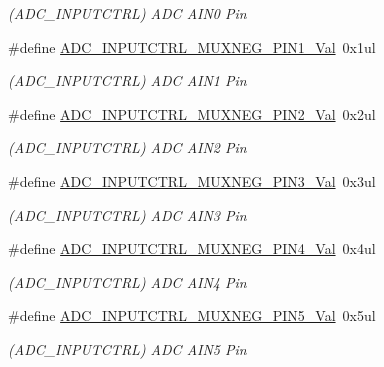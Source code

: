 \begin{DoxyCompactItemize}
\begin{DoxyCompactList}\small\item\em (A\+D\+C\+\_\+\+I\+N\+P\+U\+T\+C\+T\+RL) A\+DC A\+I\+N0 Pin \end{DoxyCompactList}\item 
\#define \mbox{\hyperlink{group___s_a_m_d21___a_d_c_gac312c379eda7c03b413687c7e26e6b94}{A\+D\+C\+\_\+\+I\+N\+P\+U\+T\+C\+T\+R\+L\+\_\+\+M\+U\+X\+N\+E\+G\+\_\+\+P\+I\+N1\+\_\+\+Val}}~0x1ul
\begin{DoxyCompactList}\small\item\em (A\+D\+C\+\_\+\+I\+N\+P\+U\+T\+C\+T\+RL) A\+DC A\+I\+N1 Pin \end{DoxyCompactList}\item 
\#define \mbox{\hyperlink{group___s_a_m_d21___a_d_c_ga5cac027516aad10977ceeea22e55a4df}{A\+D\+C\+\_\+\+I\+N\+P\+U\+T\+C\+T\+R\+L\+\_\+\+M\+U\+X\+N\+E\+G\+\_\+\+P\+I\+N2\+\_\+\+Val}}~0x2ul
\begin{DoxyCompactList}\small\item\em (A\+D\+C\+\_\+\+I\+N\+P\+U\+T\+C\+T\+RL) A\+DC A\+I\+N2 Pin \end{DoxyCompactList}\item 
\#define \mbox{\hyperlink{group___s_a_m_d21___a_d_c_gaa68f0ba48faf723b5685b98c58d0d0b4}{A\+D\+C\+\_\+\+I\+N\+P\+U\+T\+C\+T\+R\+L\+\_\+\+M\+U\+X\+N\+E\+G\+\_\+\+P\+I\+N3\+\_\+\+Val}}~0x3ul
\begin{DoxyCompactList}\small\item\em (A\+D\+C\+\_\+\+I\+N\+P\+U\+T\+C\+T\+RL) A\+DC A\+I\+N3 Pin \end{DoxyCompactList}\item 
\#define \mbox{\hyperlink{group___s_a_m_d21___a_d_c_gaf239f857af0338bbe836ed43b4c454a8}{A\+D\+C\+\_\+\+I\+N\+P\+U\+T\+C\+T\+R\+L\+\_\+\+M\+U\+X\+N\+E\+G\+\_\+\+P\+I\+N4\+\_\+\+Val}}~0x4ul
\begin{DoxyCompactList}\small\item\em (A\+D\+C\+\_\+\+I\+N\+P\+U\+T\+C\+T\+RL) A\+DC A\+I\+N4 Pin \end{DoxyCompactList}\item 
\#define \mbox{\hyperlink{group___s_a_m_d21___a_d_c_gaf54613ab0805d9fadc9a4db0f1e14c98}{A\+D\+C\+\_\+\+I\+N\+P\+U\+T\+C\+T\+R\+L\+\_\+\+M\+U\+X\+N\+E\+G\+\_\+\+P\+I\+N5\+\_\+\+Val}}~0x5ul
\begin{DoxyCompactList}\small\item\em (A\+D\+C\+\_\+\+I\+N\+P\+U\+T\+C\+T\+RL) A\+DC A\+I\+N5 Pin \end{DoxyCompactList}\item 

\end{DoxyCompactItemize}
